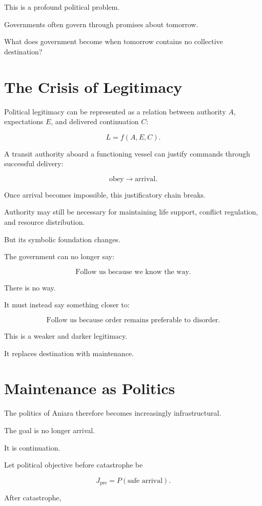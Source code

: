 \documentclass[11pt,oneside]{book}
\theoremstyle{definition}
\theoremstyle{remark}
\begin{document}
This is a profound political problem.

Governments often govern through promises about tomorrow.

What does government become when tomorrow contains no collective destination?

\section{The Crisis of Legitimacy}

Political legitimacy can be represented as a relation between authority \(A\), expectations \(E\), and delivered continuation \(C\):

\[
L
=
f(A,E,C).
\]

A transit authority aboard a functioning vessel can justify commands through successful delivery:

\[
\text{obey}
\rightarrow
\text{arrival}.
\]

Once arrival becomes impossible, this justificatory chain breaks.

Authority may still be necessary for maintaining life support, conflict regulation, and resource distribution.

But its symbolic foundation changes.

The government can no longer say:

\[
\text{Follow us because we know the way.}
\]

There is no way.

It must instead say something closer to:

\[
\text{Follow us because order remains preferable to disorder.}
\]

This is a weaker and darker legitimacy.

It replaces destination with maintenance.

\section{Maintenance as Politics}

The politics of Aniara therefore becomes increasingly infrastructural.

The goal is no longer arrival.

It is continuation.

Let political objective before catastrophe be

\[
J_{\mathrm{pre}}
=
P(\text{safe arrival}).
\]

After catastrophe,
\end{document}
